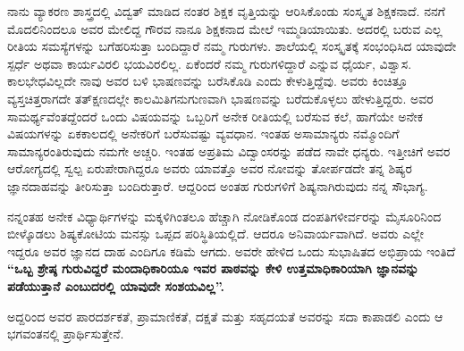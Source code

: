 {ನಾನು ವ್ಯಾಕರಣ ಶಾಸ್ತ್ರದಲ್ಲಿ ವಿದ್ವತ್ ಮಾಡಿದ ನಂತರ ಶಿಕ್ಷಕ ವೃತ್ತಿಯನ್ನು ಆರಿಸಿಕೊಂಡು ಸಂಸ್ಕೃತ ಶಿಕ್ಷಕನಾದೆ. ನನಗೆ ಮೊದಲಿನಿಂದಲೂ ಅವರ ಮೇಲಿದ್ದ ಗೌರವ ನಾನೂ ಶಿಕ್ಷಕನಾದ ಮೇಲೆ ಇಮ್ಮಡಿಯಾಯಿತು. ಅದರಲ್ಲಿ ಬರುವ ಎಲ್ಲ ರೀತಿಯ ಸಮಸ್ಯೆಗಳನ್ನು ಬಗೆಹರಿಸುತ್ತಾ ಬಂದಿದ್ದಾರೆ ನಮ್ಮ ಗುರುಗಳು. ಶಾಲೆಯಲ್ಲಿ ಸಂಸ್ಕೃತಕ್ಕೆ ಸಂಭಂಧಿಸಿದ ಯಾವುದೇ ಸ್ಪರ್ಧೆ ಅಥವಾ ಕಾರ್ಯವಿರಲಿ ಭಯವಿರಲಿಲ್ಲ. ಏಕೆಂದರೆ ನಮ್ಮ ಗುರುಗಳಿದ್ದಾರೆ ಎನ್ನುವ ಧೈರ್ಯ, ವಿಶ್ವಾಸ. ಕಾಲಭೇಧವಿಲ್ಲದೇ ನಾವು ಅವರ ಬಳಿ ಭಾಷಣವನ್ನು ಬರೆಸಿಕೊಡಿ ಎಂದು ಕೇಳುತ್ತಿದ್ದೆವು. ಅವರು ಕಿಂಚಿತ್ತೂ ವ್ಯಸ್ತಚಿತ್ತರಾಗದೇ ತತ್ಕ್ಷಣದಲ್ಲೇ ಕಾಲಮಿತಿಗನುಗುಣವಾಗಿ ಭಾಷಣವನ್ನು ಬರೆದುಕೊಳ್ಳಲು ಹೇಳುತ್ತಿದ್ದರು. ಅವರ ಸಾಮರ್ಥ್ಯವೆಂತದ್ದೆಂದರೆ ಒಂದು ವಿಷಯವನ್ನು ಒಬ್ಬರಿಗೆ ಅನೇಕ ರೀತಿಯಲ್ಲಿ ಬರೆಸುವ ಕಲೆ, ಹಾಗೆಯೇ ಅನೇಕ ವಿಷಯಗಳನ್ನು ಏಕಕಾಲದಲ್ಲಿ ಅನೇಕರಿಗೆ ಬರೆಸುವಷ್ಟು ವ್ಯವಧಾನ. ಇಂತಹ ಅಸಾಮಾನ್ಯರು ನಮ್ಮೊಂದಿಗೆ ಸಾಮಾನ್ಯರಂತಿರುವುದು ನಮಗೇ ಅಚ್ಚರಿ. ಇಂತಹ ಅಪ್ರತಿಮ ವಿದ್ವಾಂಸರನ್ನು ಪಡೆದ ನಾವೇ ಧನ್ಯರು. ಇತ್ತೀಚಿಗೆ ಅವರ ಆರೋಗ್ಯದಲ್ಲಿ ಸ್ವಲ್ಪ ಏರುಪೇರಾಗಿದ್ದರೂ ಅವರು ಯಾವತ್ತೊ ಅವರ ನೋವನ್ನು ತೋರ್ಪಡದೇ ತನ್ನ ಶಿಷ್ಯರ ಜ್ಞಾನದಾಹವನ್ನು ತೀರಿಸುತ್ತಾ ಬಂದಿರುತ್ತಾರೆ. ಆದ್ದರಿಂದ ಅಂತಹ ಗುರುಗಳಿಗೆ ಶಿಷ್ಯನಾಗಿರುವುದು ನನ್ನ ಸೌಭಾಗ್ಯ.
	
ನನ್ನಂತಹ ಅನೇಕ ವಿಧ್ಯಾರ್ಥಿಗಳನ್ನು ಮಕ್ಕಳಿಗಿಂತಲೂ ಹೆಚ್ಚಾಗಿ ನೋಡಿಕೊಂಡ ದಂಪತಿಗಳೀರ್ವರನ್ನು ಮೈಸೂರಿನಿಂದ ಬೀಳ್ಕೊಡಲು ಶಿಷ್ಯಕೋಟಿಯ ಮನಸ್ಸು ಒಪ್ಪದ ಪರಿಸ್ಥಿತಿಯಲ್ಲಿದೆ. ಆದರೂ ಅನಿವಾರ್ಯವಾಗಿದೆ. ಅವರು ಎಲ್ಲೇ ಇದ್ದರೂ ಅವರ ಜ್ಞಾನದ ದಾಹ ಎಂದಿಗೂ ಕಡಿಮೆ ಆಗದು. ಅವರೇ ಹೇಳಿದ ಒಂದು ಸುಭಾಷಿತದ ಅಭಿಪ್ರಾಯ ಇಂತಿದೆ   \enginline{-}   \textbf{“ಒಬ್ಬ ಶ್ರೇಷ್ಠ ಗುರುವಿದ್ದರೆ ಮಂದಾಧಿಕಾರಿಯೂ ಇವರ ಪಾಠವನ್ನು ಕೇಳಿ ಉತ್ತಮಾಧಿಕಾರಿಯಾಗಿ ಜ್ಞಾನವನ್ನು ಪಡೆಯುತ್ತಾನೆ ಎಂಬುದರಲ್ಲಿ ಯಾವುದೇ ಸಂಶಯವಿಲ್ಲ”.}

ಅದ್ದರಿಂದ ಅವರ ಪಾರದರ್ಶಕತೆ, ಪ್ರಾಮಾಣಿಕತೆ, ದಕ್ಷತೆ ಮತ್ತು ಸಹೃದಯತೆ ಅವರನ್ನು ಸದಾ ಕಾಪಾಡಲಿ ಎಂದು ಆ ಭಗವಂತನಲ್ಲಿ ಪ್ರಾರ್ಥಿಸುತ್ತೇನೆ.

\articleend
}
